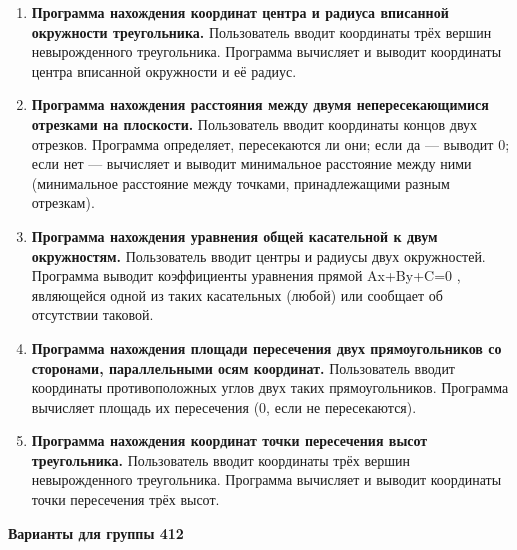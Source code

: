 \begin{enumerate}
\item[22] \textbf{Программа нахождения координат центра и радиуса вписанной окружности треугольника.}
Пользователь вводит координаты трёх вершин невырожденного треугольника. 
Программа вычисляет и выводит координаты центра вписанной окружности и её радиус.
\item[23] \textbf{Программа нахождения расстояния между двумя непересекающимися отрезками на плоскости.}
Пользователь вводит координаты концов двух отрезков. Программа определяет, 
пересекаются ли они; если да — выводит 0; если нет — 
вычисляет и выводит минимальное расстояние между ними (минимальное расстояние между точками,
принадлежащими разным отрезкам).
\item[24] \textbf{Программа нахождения уравнения общей касательной к двум окружностям.}
Пользователь вводит центры и радиусы двух окружностей. 
Программа выводит коэффициенты уравнения прямой Ax+By+C=0 , являющейся одной 
из таких касательных (любой) или сообщает об отсутствии таковой.
\item[25] \textbf{Программа нахождения площади пересечения двух прямоугольников со сторонами, параллельными осям координат.}
Пользователь вводит координаты противоположных углов двух таких прямоугольников. Программа вычисляет площадь их пересечения (0, если не пересекаются).
\item[26] \textbf{Программа нахождения координат точки пересечения высот треугольника.}
Пользователь вводит координаты трёх вершин невырожденного треугольника. 
Программа вычисляет и выводит координаты точки пересечения трёх высот.
\end{enumerate}

\textbf{Варианты для группы 412}



